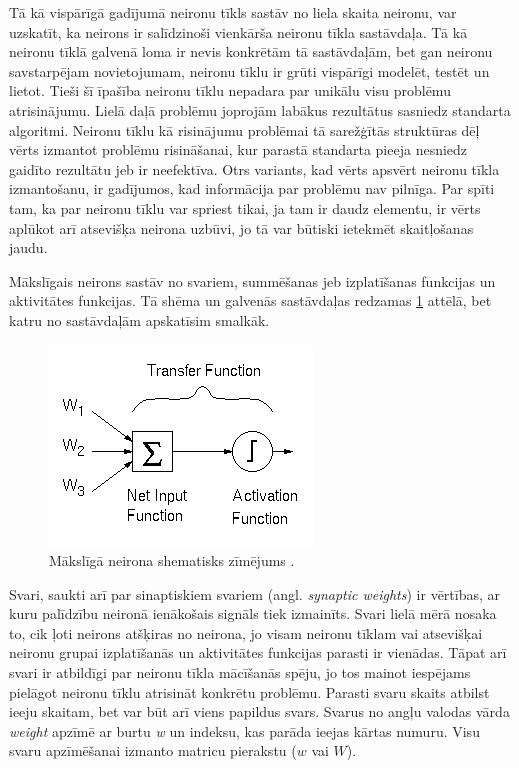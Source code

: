 \documentclass[12pt,paper=a4]{report}
\begin{document}
Tā kā vispārīgā gadījumā neironu tīkls sastāv no liela skaita neironu, var uzskatīt, ka neirons ir salīdzinoši vienkārša neironu tīkla sastāvdaļa. Tā kā neironu tīklā galvenā loma ir nevis konkrētām tā sastāvdaļām, bet gan neironu savstarpējam novietojumam, neironu tīklu ir grūti vispārīgi modelēt, testēt un lietot. Tieši šī īpašība neironu tīklu nepadara par unikālu visu problēmu atrisinājumu. Lielā daļā problēmu joprojām labākus rezultātus sasniedz standarta algoritmi. Neironu tīklu kā risinājumu problēmai tā sarežģītās struktūras dēļ vērts izmantot problēmu risināšanai, kur parastā standarta pieeja nesniedz gaidīto rezultātu jeb ir neefektīva. Otrs variants, kad vērts apsvērt neironu tīkla izmantošanu, ir gadījumos, kad informācija par problēmu nav pilnīga. Par spīti tam, ka par neironu tīklu var spriest tikai, ja tam ir daudz elementu, ir vērts aplūkot arī atsevišķa neirona uzbūvi, jo tā var būtiski ietekmēt skaitļošanas jaudu. \cite{zutersNeironuTikli}\par
Mākslīgais neirons sastāv no svariem, summēšanas jeb izplatīšanas funkcijas un aktivitātes funkcijas. Tā shēma un galvenās sastāvdaļas redzamas \ref{fig:artificialNeuron} attēlā, bet katru no sastāvdaļām apskatīsim smalkāk.
\begin{figure}[h!]
\centering
\includegraphics[scale=0.85]{transfer}
\caption{Mākslīgā neirona shematisks zīmējums \cite{dennis1997introduction}.}
\label{fig:artificialNeuron}
\end{figure}\par
Svari, saukti arī par sinaptiskiem svariem (angl. \textit{synaptic weights}) ir vērtības, ar kuru palīdzību neironā ienākošais signāls tiek izmainīts. Svari lielā mērā nosaka to, cik ļoti neirons atšķiras no neirona, jo visam neironu tīklam vai atsevišķai neironu grupai izplatīšanās un aktivitātes funkcijas parasti ir vienādas. Tāpat arī svari ir atbildīgi par neironu tīkla mācīšanās spēju, jo tos mainot iespējams pielāgot neironu tīklu atrisināt konkrētu problēmu. Parasti svaru skaits atbilst ieeju skaitam, bet var būt arī viens papildus svars. Svarus no angļu valodas vārda \textit{weight} apzīmē ar burtu \textit{w} un indeksu, kas parāda ieejas kārtas numuru. Visu svaru apzīmēšanai izmanto matricu pierakstu ($w$ vai $W$).\cite{zutersNeironuTikli}\par
\end{document}
